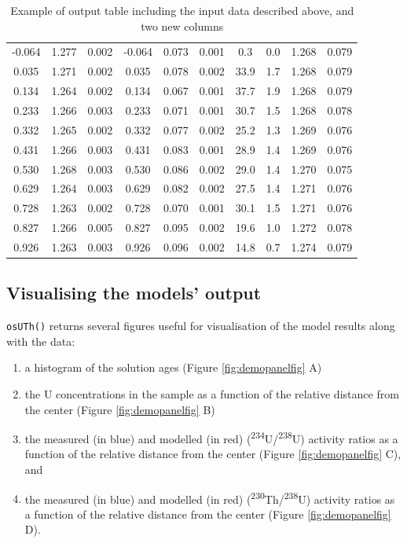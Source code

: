 \documentclass[]{elsarticle} %
\providecommand{\tightlist}{%
  \setlength{\itemsep}{0pt}\setlength{\parskip}{0pt}}
\begin{document}
\begin{table}[ht]
\begin{tabular}{cccccccccc}
  -0.064 & 1.277 & 0.002 & -0.064 & 0.073 & 0.001 & 0.3 & 0.0 & 1.268 & 0.079 \\ 
  0.035 & 1.271 & 0.002 & 0.035 & 0.078 & 0.002 & 33.9 & 1.7 & 1.268 & 0.079 \\ 
  0.134 & 1.264 & 0.002 & 0.134 & 0.067 & 0.001 & 37.7 & 1.9 & 1.268 & 0.079 \\ 
  0.233 & 1.266 & 0.003 & 0.233 & 0.071 & 0.001 & 30.7 & 1.5 & 1.268 & 0.078 \\ 
  0.332 & 1.265 & 0.002 & 0.332 & 0.077 & 0.002 & 25.2 & 1.3 & 1.269 & 0.076 \\ 
  0.431 & 1.266 & 0.003 & 0.431 & 0.083 & 0.001 & 28.9 & 1.4 & 1.269 & 0.076 \\ 
  0.530 & 1.268 & 0.003 & 0.530 & 0.086 & 0.002 & 29.0 & 1.4 & 1.270 & 0.075 \\ 
  0.629 & 1.264 & 0.003 & 0.629 & 0.082 & 0.002 & 27.5 & 1.4 & 1.271 & 0.076 \\ 
  0.728 & 1.263 & 0.002 & 0.728 & 0.070 & 0.001 & 30.1 & 1.5 & 1.271 & 0.076 \\ 
  0.827 & 1.266 & 0.005 & 0.827 & 0.095 & 0.002 & 19.6 & 1.0 & 1.272 & 0.078 \\ 
  0.926 & 1.263 & 0.003 & 0.926 & 0.096 & 0.002 & 14.8 & 0.7 & 1.274 & 0.079 \\ 
   \hline
\end{tabular}
\caption{\label{tab:outputdata}Example of output table including the input data described above, and two new columns} 
\end{table}

\hypertarget{visualising-the-models-output}{%
\subsection{Visualising the models' output}\label{visualising-the-models-output}}

\texttt{osUTh()} returns several figures useful for visualisation of the model results along with the data:

\begin{enumerate}
\def\labelenumi{\arabic{enumi}.}
\tightlist
\item
  a histogram of the solution ages (Figure \ref{fig:demopanelfig} A)
\item
  the U concentrations in the sample as a function of the relative distance from the center (Figure \ref{fig:demopanelfig} B)
\item
  the measured (in blue) and modelled (in red) (\textsuperscript{234}U/\textsuperscript{238}U) activity ratios as a function of the relative distance from the center (Figure \ref{fig:demopanelfig} C), and
\item
  the measured (in blue) and modelled (in red) (\textsuperscript{230}Th/\textsuperscript{238}U) activity ratios as a function of the relative distance from the center (Figure \ref{fig:demopanelfig} D).
\end{enumerate}
\end{document}
